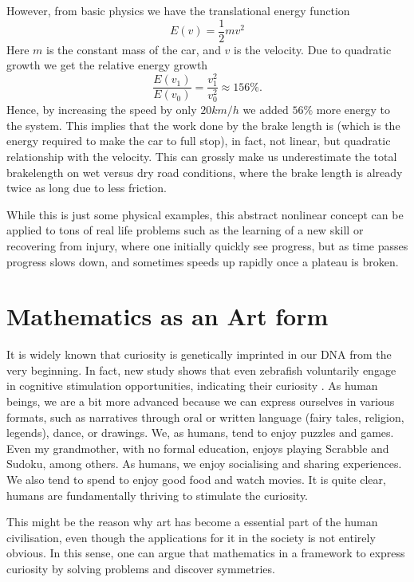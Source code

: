 \documentclass[10pt,twocolumn]{article}
\begin{document}
\begin{sloppy}
However, from basic physics we have the translational energy function \begin{equation}
    E( v)  = \frac{1}{2} m v^2
\end{equation}
Here $m$ is the constant mass of the car, and $v$ is the velocity.
Due to quadratic growth we get the relative energy growth $$\frac{ E( v_{1} )}{E( v_{0})} = \frac{v_{1}^2}{v_{0}^2 } \approx 156 \%.     $$ Hence, by increasing the speed by only $20km /h$ we added $   56\% $ more energy to the system.
This implies that the work done by the brake length is (which is the energy required to make the car to full stop), in fact, not linear, but quadratic relationship with the velocity.
This can grossly make us underestimate the total brakelength on wet versus dry road conditions, where the brake length is already twice as long due to less friction.

While this is just some physical examples, this abstract nonlinear concept can be applied to tons of real life problems such as the learning of a new skill or recovering from injury, where one initially quickly see progress, but as time passes
progress slows down, and sometimes speeds up rapidly once a plateau is broken.




\section*{Mathematics as an Art form}%
\label{sec:mathematics_for_stimulating_intellectual_mind}


It is widely known that curiosity is genetically imprinted in our DNA from the very beginning.
In fact, new study shows that even zebrafish voluntarily engage in cognitive stimulation opportunities, indicating their curiosity \cite{franks2023curiosity}.
As human beings, we are a bit more advanced because we can express ourselves in various formats, such as narratives through oral or written language (fairy tales, religion, legends), dance, or drawings. We, as humans, tend to enjoy puzzles and games.
Even my grandmother, with no formal education, enjoys playing Scrabble and Sudoku, among others.
As humans, we enjoy socialising and sharing experiences. We also tend to spend to enjoy good food and watch movies. It is quite clear, humans are fundamentally thriving to stimulate the curiosity.

This might be the reason why art has become a essential part of the human civilisation, even though the applications for it in the society is not entirely obvious.
In this sense, one can argue that mathematics in a framework to express curiosity by
solving problems and discover symmetries.


\end{sloppy}
\end{document}

